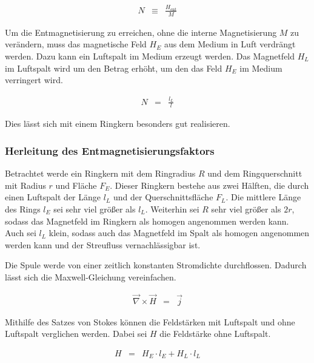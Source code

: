 \documentclass[12pt,a4paper]{scrartcl}
\numberwithin{equation}{section} %
\renewcommand{\[}{} %
\renewcommand{\]}{\noindent} %
\begin{document}
\[
\begin{eqnarray}
    N &\equiv& \frac{H_\mathrm{ent}}{M} \label{defN}
\end{eqnarray}
\]

Um die Entmagnetisierung zu erreichen, ohne die interne Magnetisierung
\(M\) zu verändern, muss das magnetische Feld \(H_E\) aus dem Medium in
Luft verdrängt werden. Dazu kann ein Luftspalt im Medium erzeugt werden.
Das Magnetfeld \(H_L\) im Luftspalt wird um den Betrag erhöht, um den
das Feld \(H_E\) im Medium verringert wird.

\[
\begin{eqnarray}
    N &=& \frac{l_L}{l} \label{N}
\end{eqnarray}
\]

Dies lässt sich mit einem Ringkern besonders gut realisieren.

\hypertarget{herleitung-des-entmagnetisierungsfaktors}{%
\subsubsection{Herleitung des
Entmagnetisierungsfaktors}\label{herleitung-des-entmagnetisierungsfaktors}}

Betrachtet werde ein Ringkern mit dem Ringradius \(R\) und dem
Ringquerschnitt mit Radius \(r\) und Fläche \(F_E\). Dieser Ringkern
bestehe aus zwei Hälften, die durch einen Luftspalt der Länge \(l_L\)
und der Querschnittsfläche \(F_L\). Die mittlere Länge des Rings \(l_E\)
sei sehr viel größer als \(l_L\). Weiterhin sei \(R\) sehr viel größer
als \(2r\), sodass das Magnetfeld im Ringkern als homogen angenommen
werden kann. Auch sei \(l_L\) klein, sodass auch das Magnetfeld im Spalt
als homogen angenommen werden kann und der Streufluss vernachlässigbar
ist.

Die Spule werde von einer zeitlich konstanten Stromdichte durchflossen.
Dadurch lässt sich die Maxwell-Gleichung vereinfachen.

\[
\begin{eqnarray}
    \vec \nabla \times \vec H &=& \vec j
\end{eqnarray}
\]

Mithilfe des Satzes von Stokes können die Feldstärken mit Luftspalt und
ohne Luftspalt verglichen werden. Dabei sei \(H\) die Feldstärke ohne
Luftspalt.

\[
\begin{eqnarray}
    H &=& H_E\cdot l_E + H_L \cdot l_L \label{EF1}
\end{eqnarray}
\]
\end{document}
